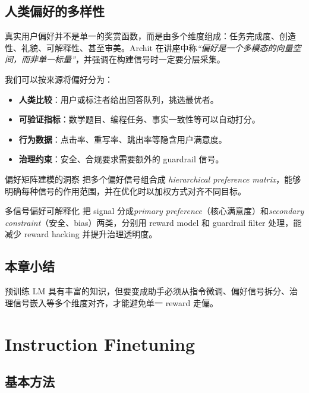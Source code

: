 \documentclass[a4paper]{article}
\begin{document}
\subsection{人类偏好的多样性}

真实用户偏好并不是单一的奖赏函数，而是由多个维度组成：任务完成度、创造性、礼貌、可解释性、甚至审美。Archit 在讲座中称\textit{``偏好是一个多模态的向量空间，而非单一标量''}，并强调在构建信号时一定要分层采集。

我们可以按来源将偏好分为：
\begin{itemize}
    \item \textbf{人类比较}：用户或标注者给出回答队列，挑选最优者。
    \item \textbf{可验证指标}：数学题目、编程任务、事实一致性等可以自动打分。
    \item \textbf{行为数据}：点击率、重写率、跳出率等隐含用户满意度。
    \item \textbf{治理约束}：安全、合规要求需要额外的 guardrail 信号。
\end{itemize}

\begin{knowledgebox}{偏好矩阵建模的洞察}
把多个偏好信号组合成 \textit{hierarchical preference matrix}，能够明确每种信号的作用范围，并在优化时以加权方式对齐不同目标。
\end{knowledgebox}

\begin{importantbox}{多信号偏好可解释化}
把 signal 分成\textit{primary preference}（核心满意度）和\textit{secondary constraint}（安全、bias）两类，分别用 reward model 和 guardrail filter 处理，能减少 reward hacking 并提升治理透明度。
\end{importantbox}

\subsection{本章小结}

预训练 LM 具有丰富的知识，但要变成助手必须从指令微调、偏好信号拆分、治理信号嵌入等多个维度对齐，才能避免单一 reward 走偏。

\section{Instruction Finetuning}

\subsection{基本方法}
\end{document}
